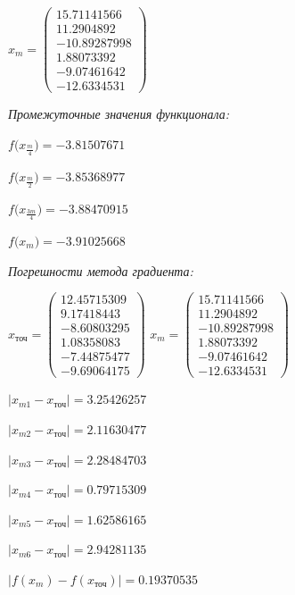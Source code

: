 \documentclass[a4paper, 14pt]{extarticle}
\begin{document}
	 $x_{m} = \begin{pmatrix}
	 	15.71141566\\
	 	11.2904892\\
	 	-10.89287998\\
	 	1.88073392\\
	 	-9.07461642\\
	 	-12.6334531
	 \end{pmatrix} $
	\pagebreak
	
 	\textit{Промежуточные значения функционала:}
 	
 		$f\big(x_{\frac{m}{4}}\big) = -3.81507671$
 		
 		$f\big(x_{\frac{m}{2}}\big) = -3.85368977$
 		
 		$f\big(x_{\frac{3m}{4}}\big) = -3.88470915$
 		
 		$f\big(x_m) = -3.91025668$
 		
 	\textit{Погрешности метода градиента:}
 	
 	$x_{\text{точ}} = \begin{pmatrix}
			12.45715309\\
			9.17418443\\
			-8.60803295\\
			1.08358083\\
			-7.44875477\\
			-9.69064175
		\end{pmatrix}$
	$x_{m} = \begin{pmatrix}
		15.71141566\\
		11.2904892\\
		-10.89287998\\
		1.88073392\\
		-9.07461642\\
		-12.6334531
	\end{pmatrix}$
	
 	$|x_{m1} - x_{\text{точ}}| = 3.25426257$
 	
 	$|x_{m2} - x_{\text{точ}}| = 2.11630477$
 	
 	$|x_{m3} - x_{\text{точ}}| = 2.28484703$
 	
 	$|x_{m4} - x_{\text{точ}}| = 0.79715309$
 	
 	$|x_{m5} - x_{\text{точ}}| = 1.62586165$
 	
 	$|x_{m6} - x_{\text{точ}}| = 2.94281135$
 	
 	$|f(x_m) - f(x_{\text{точ}})| = 0.19370535$
 	
\end{document}
